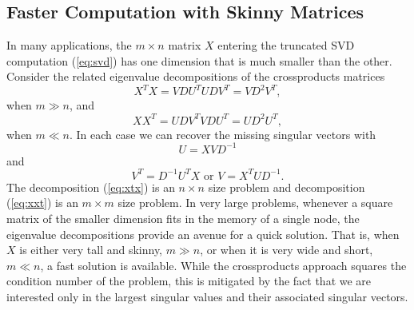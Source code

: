 \subsection{Faster Computation with Skinny Matrices}
In many applications, the $m\times n$ matrix $X$ entering the
truncated SVD computation (\ref{eq:svd}) has one dimension that is
much smaller than the other. Consider the related eigenvalue
decompositions of the crossproducts matrices
\begin{equation}
  X^TX = V D U^T U D V^T = V D^2 V^T,
  \label{eq:xtx}
\end{equation}
when $m \gg n$,
and
\begin{equation}
  XX^T = U D V^T V D U^T = U D^2 U^T,
  \label{eq:xxt}
\end{equation}
when $m \ll n$.
In each case we can recover the missing singular vectors with
\begin{displaymath}
  U = XVD^{-1}
\end{displaymath}
and
\begin{equation}
  V^T = D^{-1}U^TX \mbox{ or } V = X^TUD^{-1}.
  \label{eq:vtorv}
\end{equation}
The decomposition (\ref{eq:xtx}) is an $n\times n$ size problem and
decomposition (\ref{eq:xxt}) is an $m\times m$ size problem. In very
large problems, whenever a square matrix of the smaller dimension fits
in the memory of a single node, the eigenvalue decompositions provide
an avenue for a quick solution. That is, when $X$ is either very tall
and skinny, $m \gg n$, or when it is very wide and short, $m \ll n$, a
fast solution is available. While the crossproducts approach squares
the condition number of the problem, this is mitigated by the fact
that we are interested only in the largest singular values and their
associated singular vectors.

